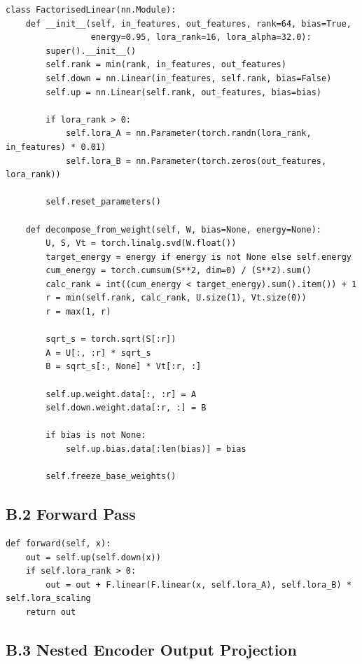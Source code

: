 \begin{lstlisting}
class FactorisedLinear(nn.Module):
    def __init__(self, in_features, out_features, rank=64, bias=True,
                 energy=0.95, lora_rank=16, lora_alpha=32.0):
        super().__init__()
        self.rank = min(rank, in_features, out_features)
        self.down = nn.Linear(in_features, self.rank, bias=False)
        self.up = nn.Linear(self.rank, out_features, bias=bias)
        
        if lora_rank > 0:
            self.lora_A = nn.Parameter(torch.randn(lora_rank, in_features) * 0.01)
            self.lora_B = nn.Parameter(torch.zeros(out_features, lora_rank))
        
        self.reset_parameters()
    
    def decompose_from_weight(self, W, bias=None, energy=None):
        U, S, Vt = torch.linalg.svd(W.float())
        target_energy = energy if energy is not None else self.energy
        cum_energy = torch.cumsum(S**2, dim=0) / (S**2).sum()
        calc_rank = int((cum_energy < target_energy).sum().item()) + 1
        r = min(self.rank, calc_rank, U.size(1), Vt.size(0))
        r = max(1, r)
        
        sqrt_s = torch.sqrt(S[:r])
        A = U[:, :r] * sqrt_s
        B = sqrt_s[:, None] * Vt[:r, :]
        
        self.up.weight.data[:, :r] = A
        self.down.weight.data[:r, :] = B
        
        if bias is not None:
            self.up.bias.data[:len(bias)] = bias
        
        self.freeze_base_weights()
\end{lstlisting}

\subsection{B.2 Forward Pass}

\begin{lstlisting}
def forward(self, x):
    out = self.up(self.down(x))
    if self.lora_rank > 0:
        out = out + F.linear(F.linear(x, self.lora_A), self.lora_B) * self.lora_scaling
    return out
\end{lstlisting}

\subsection{B.3 Nested Encoder Output Projection}

